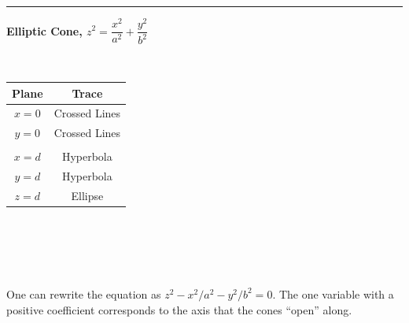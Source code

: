 \noindent\rule{\linewidth}{.5pt}

\noindent\textbf{Elliptic Cone, \quad$z^2=\dfrac{x^2}{a^2}+\dfrac{y^2}{b^2}$}\bigskip\\
\begin{minipage}{1.1\linewidth}
 \noindent%
 \begin{minipage}[c]{.25\linewidth}
  \mbox{}\\
 \end{minipage}%
 \begin{minipage}[c]{.2\linewidth}
  \begin{tabular}{cc}
   \textbf{Plane}  & \textbf{Trace} \\\midrule
   $x=0$ & Crossed Lines \\
   $y=0$ & Crossed Lines\\\\
   $x=d$ & Hyperbola\\
   $y=d$ & Hyperbola\\
   $z=d$ & Ellipse
  \end{tabular}
 \end{minipage}%
 \begin{minipage}[c]{.55\linewidth}
  \mbox{}\\
\ %
 \end{minipage}
 \bigskip\\
 \begin{minipage}{.75\linewidth}
  One can rewrite the equation as $z^2-x^2/a^2-y^2/{b^2} = 0$. The one variable with a positive coefficient corresponds to the axis that the cones ``open'' along. 
 \end{minipage}
\end{minipage}

\clearpage

